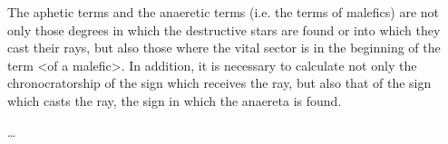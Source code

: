 \enlargethispage{2\baselineskip}
The aphetic terms and the anaeretic terms (i.e. the terms of malefics) are not only those degrees in which the destructive stars are found or into which they cast their rays, but also those where the vital sector is in the beginning of the term <of a malefic>. In addition, it is necessary to calculate not only the chronocratorship of the sign which receives the ray, but also that of the sign which casts the ray, the sign in which the anaereta is found.

\ldots

\newpage